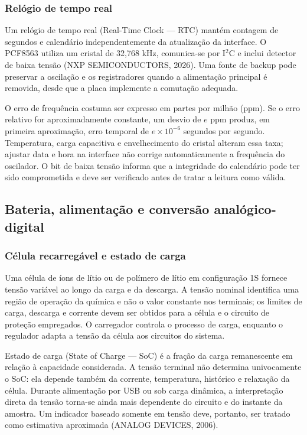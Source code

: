 \documentclass[a4paper,12pt]{article}
\begin{document}
\subsubsection{Rel\'ogio de tempo real}


Um rel\'ogio de tempo real (Real-Time Clock --- RTC) mant\'em contagem de segundos e calend\'ario independentemente da atualiza\c{c}\~ao da interface. O PCF8563 utiliza um cristal de 32,768 kHz, comunica-se por I$^2$C e inclui detector de baixa tens\~ao (NXP SEMICONDUCTORS, 2026). Uma fonte de backup pode preservar a oscila\c{c}\~ao e os registradores quando a alimenta\c{c}\~ao principal \'e removida, desde que a placa implemente a comuta\c{c}\~ao adequada.


O erro de frequ\^encia costuma ser expresso em partes por milh\~ao (ppm). Se o erro relativo for aproximadamente constante, um desvio de \(e\) ppm produz, em primeira aproxima\c{c}\~ao, erro temporal de \(e\times10^{-6}\) segundos por segundo. Temperatura, carga capacitiva e envelhecimento do cristal alteram essa taxa; ajustar data e hora na interface n\~ao corrige automaticamente a frequ\^encia do oscilador. O bit de baixa tens\~ao informa que a integridade do calend\'ario pode ter sido comprometida e deve ser verificado antes de tratar a leitura como v\'alida.


\subsection{Bateria, alimenta\c{c}\~ao e convers\~ao anal\'ogico-digital}


\subsubsection{C\'elula recarreg\'avel e estado de carga}


Uma c\'elula de \'ions de l\'itio ou de pol\'imero de l\'itio em configura\c{c}\~ao 1S fornece tens\~ao vari\'avel ao longo da carga e da descarga. A tens\~ao nominal identifica uma regi\~ao de opera\c{c}\~ao da qu\'imica e n\~ao o valor constante nos terminais; os limites de carga, descarga e corrente devem ser obtidos para a c\'elula e o circuito de prote\c{c}\~ao empregados. O carregador controla o processo de carga, enquanto o regulador adapta a tens\~ao da c\'elula aos circuitos do sistema.


Estado de carga (State of Charge --- SoC) \'e a fra\c{c}\~ao da carga remanescente em rela\c{c}\~ao \`a capacidade considerada. A tens\~ao terminal n\~ao determina univocamente o SoC: ela depende tamb\'em da corrente, temperatura, hist\'orico e relaxa\c{c}\~ao da c\'elula. Durante alimenta\c{c}\~ao por USB ou sob carga din\^amica, a interpreta\c{c}\~ao direta da tens\~ao torna-se ainda mais dependente do circuito e do instante da amostra. Um indicador baseado somente em tens\~ao deve, portanto, ser tratado como estimativa aproximada (ANALOG DEVICES, 2006).
\end{document}

